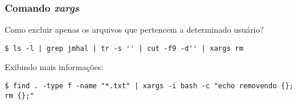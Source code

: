 \documentclass{beamer}
\begin{document}
\begin{frame}[fragile]
   \frametitle{Comando \textit{xargs}}
   Como excluir apenas os arquivos que pertencem a determinado usuário? 
   \small
   \begin{verbatim}
$ ls -l | grep jmhal | tr -s '' | cut -f9 -d'' | xargs rm  
   \end{verbatim}
   \normalsize
   Exibindo mais informações:
   \scriptsize
   \begin{verbatim}
$ find . -type f -name "*.txt" | xargs -i bash -c "echo removendo {}; rm {};" 
   \end{verbatim}
\end{frame}


\end{document}
